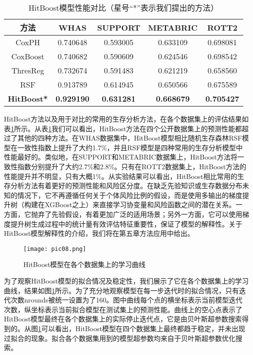 \begin{table}[h]
\caption{HitBoost模型性能对比（星号“*”表示我们提出的方法）}
\begin{tabular}{ccccc}
\toprule
方法 & WHAS & SUPPORT & METABRIC & ROTT2 \\ 
\midrule
CoxPH & 0.740648 & 0.593005 & 0.633109 & 0.698081 \\
CoxBoost & 0.740682 & 0.590609 & 0.624546 & 0.698542 \\
ThresReg & 0.732674 & 0.591483 & 0.621219 & 0.658560 \\
RSF & 0.913789 & 0.614945 & 0.650566 & 0.675589 \\
\textbf{HitBoost*} & \textbf{0.929190} & \textbf{0.631281} & \textbf{0.668679} & \textbf{0.705427} \\
\bottomrule
\end{tabular}
\label{table04}
\end{table}

HitBoost方法以及用于对比的常用的生存分析方法，在各个数据集上的评估结果如表\ref{table04}所示。从表\ref{table04}我们可以看出，HitBoost方法在四个公开数据集上的预测性能都超过了其他的四种方法。在WHAS数据集中，HitBoost模型相比随机生存森林RSF模型在一致性指数上提升了大约1.7\%，并且RSF模型是四种常用的生存分析模型中性能最好的。类似地，在SUPPORT和METABRIC数据集上，HitBoost方法将一致性指数分别提升了大约2.7\%和2.8\%。只有在ROTT2数据集上，HitBoost方法的性能提升并不明显，只有大概1\%。从实验结果可以看出，HitBoost相比常用的生存分析方法有着更好的预测性能和风险区分度。在缺乏先验知识或生存数据分布未知的情况下，它不再遵循任何关于个体风险比例的假设，而是使用多输出的梯度提升树（构建在XGBoost之上）来直接学习协变量和风险函数之间的潜在关系。一方面，它抛弃了先验假设，有着更加广泛的适用场景；另外一方面，它可以使用梯度提升树生成过程中的统计量有效评估特征重要性，保证了模型的解释性。关于HitBoost模型解释性的介绍，我们将在第五章方法应用中给出。

\begin{figure}[H]
\texttt{[image: pic08.png]}
\caption{HitBoost模型在各个数据集上的学习曲线}
\label{pic08}
\end{figure}

为了观察HitBoost模型的拟合情况及稳定性，我们展示了它在各个数据集上的学习曲线，结果如图\ref{pic08}所示。为了充分地观察模型在每一步迭代时的拟合情况，只有迭代次数nrounds被统一设置为了160。图中曲线每个点的横坐标表示当前模型迭代次数，纵坐标表示当前拟合模型在测试集上的预测性能。曲线上的空心点表示了HitBoost模型最终在各个数据集上的实际停止迭代点，它是由贝叶斯超参数搜索得到的。从图\ref{pic08}可以看出，HitBoost模型在四个数据集上最终都趋于稳定，并未出现过拟合的现象。拟合各个数据集用到的模型超参数均来自于贝叶斯超参数优化搜索。

